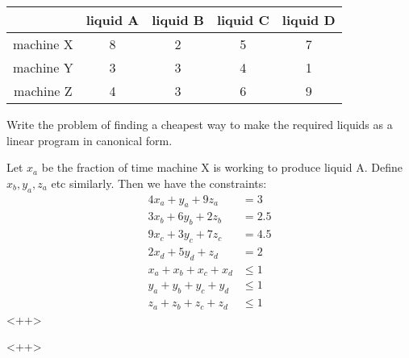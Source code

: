 \documentclass{article}
\begin{document}
\begin{itemize}
		\begin{center}
			\begin{tabular}{c|cccc}
				& liquid A & liquid B & liquid C & liquid D \\
				\hline
				machine X & 8 & 2 & 5 & 7 \\
				machine Y & 3 & 3 & 4 & 1 \\
				machine Z & 4 & 3 & 6 & 9
			\end{tabular}
		\end{center}
		Write the problem of finding a cheapest way to make the required liquids as a linear program in canonical form.
		\begin{soln}
			Let $x_a$ be the fraction of time machine X is working to produce liquid A. Define $x_b, y_a, z_a$ etc similarly. Then we have the constraints:
			\begin{align*}
				4x_a+y_a+9z_a &= 3 \\
				3x_b+6y_b+2z_b &= 2.5 \\
				9x_c+3y_c+7z_c &= 4.5 \\
				2x_d + 5y_d + z_d &= 2 \\
				x_a+x_b+x_c+x_d &\le 1 \\
				y_a+y_b+y_c+y_d &\le 1 \\
				z_a+z_b+z_c+z_d &\le 1
			\end{align*}<++>
		\end{soln}<++>

\end{itemize}
\end{document}
